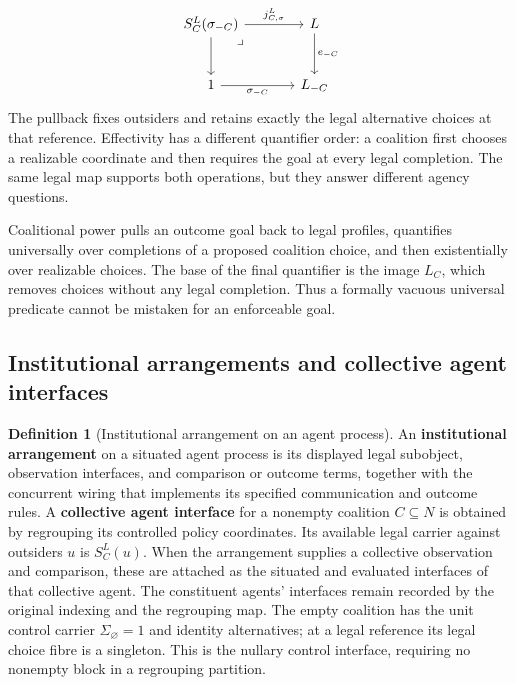\documentclass[11pt,a4paper]{article}
\numberwithin{equation}{section}
\theoremstyle{definition}
\newtheorem{definition}[theorem]{Definition}
\theoremstyle{remark}
\theoremstyle{plain}
\begin{document}
\[
\begin{tikzcd}[column sep=large,row sep=large]
 S_C^L(\sigma_{-C}) \arrow[r,"j^L_{C,\sigma}"] \arrow[d]
 \arrow[dr,phantom,very near start,"\lrcorner"] &
 L \arrow[d,"e_{-C}"]\\
 1 \arrow[r,"\sigma_{-C}"'] & L_{-C}
\end{tikzcd}
\]
The pullback fixes outsiders and retains exactly the legal
alternative choices at that reference. Effectivity has a different
quantifier order: a coalition first chooses a realizable coordinate and
then requires the goal at every legal completion. The same legal map
supports both operations, but they answer different agency questions.

Coalitional power pulls an outcome goal back to legal profiles,
quantifies universally over completions of a proposed coalition choice,
and then existentially over realizable choices. The base of the final
quantifier is the image $L_C$, which removes choices without any legal
completion. Thus a formally vacuous universal predicate cannot be
mistaken for an enforceable goal.

\subsection{Institutional arrangements and collective agent interfaces}

\begin{definition}[Institutional arrangement on an agent process]
\label{def:egt-institutional-agent-arrangement}
An \textbf{institutional arrangement} on a situated agent process is its
displayed legal subobject, observation interfaces, and comparison or outcome
terms, together with the concurrent wiring that implements its specified
communication and outcome rules. A \textbf{collective agent interface} for a
nonempty coalition $C\subseteq N$ is obtained by regrouping its controlled
policy coordinates.
Its available legal carrier against outsiders $u$ is $S_C^L(u)$.
When the arrangement supplies a collective observation and comparison, these
are attached as the situated and evaluated interfaces of that collective
agent. The constituent agents' interfaces remain recorded by the original
indexing and the regrouping map. The empty coalition has the unit control
carrier $\Sigma_\varnothing=1$ and identity alternatives; at a legal
reference its legal choice fibre is a singleton. This is the nullary control
interface, requiring no nonempty block in a regrouping partition.
\end{definition}
\end{document}
